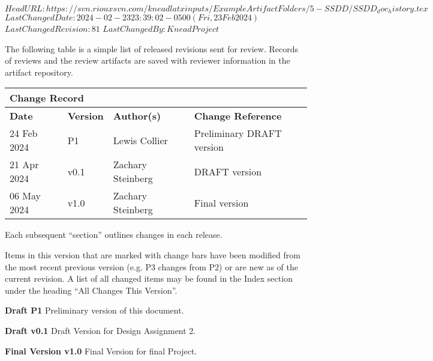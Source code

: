 \svnidlong
{$HeadURL: https://svn.riouxsvn.com/kneadlatxinputs/ExampleArtifactFolders/5-SSDD/SSDD_doc_history.tex $}
{$LastChangedDate: 2024-02-23 23:39:02 -0500 (Fri, 23 Feb 2024) $}
{$LastChangedRevision: 81 $}
{$LastChangedBy: KneadProject $}

The following table is a simple list of released revisions sent for review.
Records of reviews and the review artifacts are saved with reviewer information in the \KNEADagencyName artifact repository.

\begin{table}[h]
	\centering 
		\begin{tabular}{|p{1.0in}|p{0.8in}|p{1.4in}|p{2.1in}|}
    \multicolumn{4}{l}{\bfseries Change Record} \\
		\hline
			{\bfseries Date}  &  {\bfseries Version} & {\bfseries Author(s)} & {\bfseries Change Reference} \\
		\hline
		\hline
			 24 Feb 2024	&	\centering	P1	&	{\raggedright Lewis Collier}	&	Preliminary DRAFT version  \\ \hline
			 21 Apr 2024	&	\centering	v0.1	&	{\raggedright Zachary Steinberg}	&	DRAFT version  \\ \hline
			 06 May 2024	&	\centering	v1.0	&	{\raggedright Zachary Steinberg}	&	Final version \\ \hline
		\hline		
		\hline				
  	\end{tabular}
\end{table}

Each subsequent ``section'' outlines changes in each release.

Items in this version that are marked with change bars have been modified from the most recent previous version (e.g. P3 changes from P2) or are new as of the current revision. A list of all changed items may be found in the Index section under the heading ``All Changes This Version''.

{\bf Draft P1}
Preliminary version of this document.

{\bf Draft v0.1}
Draft Version for Design Assignment 2.

{\bf Final Version v1.0}
Final Version for final Project.



